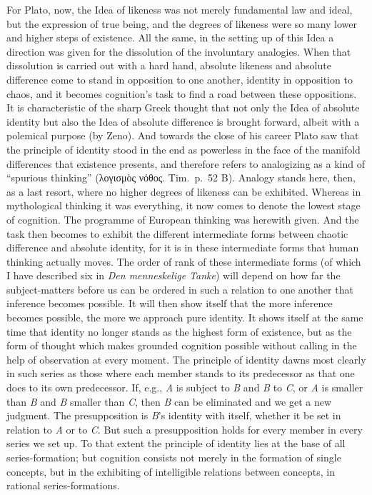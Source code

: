\documentclass[12pt]{book}
\newcommand{\opage}[1]{\marginnote{\footnotesize\textit{[#1]}}}
\begin{document}
For Plato, now, the Idea of likeness was not merely fundamental law and ideal,
but the expression of true being, and the degrees of likeness were so many lower
and higher steps of existence. All the same, in the setting up of this Idea a
direction was given for the dissolution of the involuntary analogies. When that
dissolution is carried out with a hard hand, absolute likeness and absolute
difference come to stand in opposition to one another, identity in opposition to
chaos, and it becomes cognition's task to find a road between these oppositions.
It is characteristic of the sharp Greek thought that not only the Idea of
absolute identity but also the Idea of absolute difference is brought forward,
albeit with a polemical purpose (by Zeno). And towards the close of his career
Plato saw that the principle of identity stood in the end as powerless in the
face of the manifold differences that existence presents, and therefore refers
to analogizing as a kind of ``spurious thinking'' (λογισμὸς νόθος. Tim.\ p.\ 52
B). Analogy stands here, then, as a last resort, where no higher degrees of
likeness can be exhibited. Whereas in \opage{39}mythological thinking it was everything,
it now comes to denote the lowest stage of cognition. The programme of European
thinking was herewith given. And the task then becomes to exhibit the different
intermediate forms between chaotic difference and absolute identity, for it is
in these intermediate forms that human thinking actually moves. The order of
rank of these intermediate forms (of which I have described six in
\textit{Den menneskelige Tanke}) will depend on how far the subject-matters
before us can be ordered in such a relation to one another that inference
becomes possible. It will then show itself that the more inference becomes
possible, the more we approach pure identity. It shows itself at the same time
that identity no longer stands as the highest form of existence, but as the form
of thought which makes grounded cognition possible without calling in the help
of observation at every moment. The principle of identity dawns most clearly in
such series as those where each member stands to its predecessor as that one
does to its own predecessor. If, e.g., \textit{A} is subject to \textit{B} and
\textit{B} to \textit{C}, or \textit{A} is smaller than \textit{B} and
\textit{B} smaller than \textit{C}, then \textit{B} can be eliminated and we get
a new judgment. The presupposition is \textit{B}'s identity with itself, whether
it be set in relation to \textit{A} or to \textit{C}. But such a presupposition
holds for every member in every series we set up. To that extent the principle
of identity lies at the base of all series-formation; but cognition consists not
merely in the formation of single concepts, but in the exhibiting of
intelligible relations between concepts, in rational series-formations.
\end{document}
